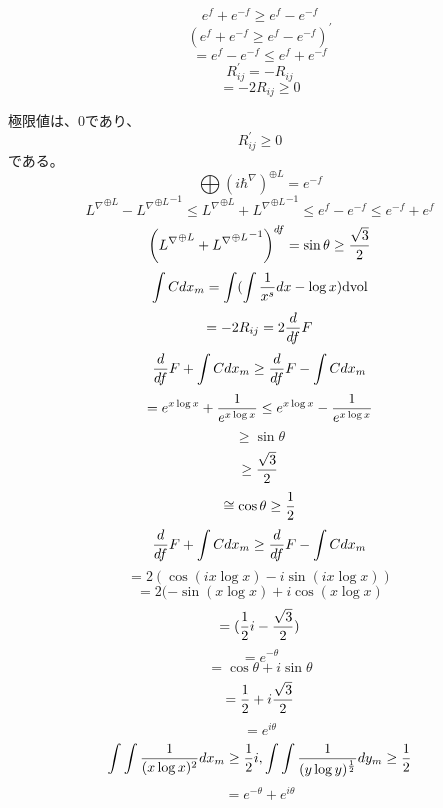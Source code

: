 \documentclass{jsarticle}
\begin{document}
  $$ e^{f} + e^{-f} \ge e^{f} - e^{-f} $$
  $$  (e^{f} + e^{-f} \ge e^{f} - e^{-f})^{'} $$
  $$ = e^{f} - e^{-f} \le e^{f} + e^{-f} $$
  $$ R^{'}_{ij} = - R_{ij} $$
  $$ = -2 R_{ij} \ge 0 $$

  極限値は、0であり、
  $$ R^{'}_{ij} \ge 0 $$
  である。
  $$ \bigoplus{(i \hbar^{\nabla})}^{\oplus L} = e^{-f} $$
  $$ {L^{\nabla}}^{\oplus L} - {{L^{\nabla}}^{\oplus L}}^{-1} 
  \le {L^{\nabla}}^{\oplus L} + {{L^{\nabla}}^{\oplus L}}^{-1} \le
  e^{f} - e^{-f} \le e^{-f} + e^{f} $$
  $$ \left({L^{\nabla}}^{\oplus L} + {{L^{\nabla}}^{\oplus L}}^{-1}\right)^{df}
  = \sin \theta \ge {\sqrt{3} \over 2} $$
  $$ \int C dx_m = \int(\int {1 \over x^s}dx - \log x)\mathrm{dvol} $$
  $$ = -2 R_{ij} = 2 {d \over df}F $$
  $$ {d \over df}F + \int C dx_m \ge {d \over df}F - \int C dx_m $$
  $$ = e^{x \log x} + {1 \over e^{x \log x}} \le e^{x \log x} - {1 \over e^{x \log x}} $$
  $$ \ge \sin \theta $$
  $$ \ge {\sqrt{3} \over 2} $$
  $$ \cong \cos \theta \ge {1 \over 2}$$
  $$ {d \over df}F + \int C dx_m \ge {d \over df}F - \int C dx_m $$
  $$ = 2(\cos(i x\log x) - i\sin(i x\log x)) $$
  $$ = 2(-\sin(x \log x) + i\cos(x \log x) $$
  $$ = ({1 \over  2}i - {{\sqrt{3} \over 2})} $$
  $$ = e^{-\theta} $$
  $$ = \cos \theta + i \sin \theta $$
  $$ = {{1 \over 2}} + i{{\sqrt{3} \over 2}}$$
  $$ = e^{i\theta} $$
  $$ \int \int{1 \over (x \log x)^{2}}dx_m \ge {1 \over 2}i, \int \int{1 \over (y \log y)^{1 \over 2}}dy_m
  \ge {1 \over 2} $$
  $$ = e^{-\theta} + e^{i\theta} $$
  $$ $$
\end{document}
